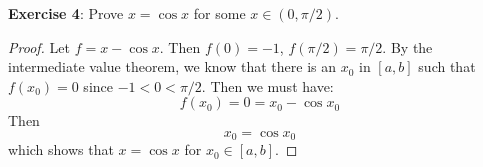 \documentclass{article}
\begin{document}
\textbf{Exercise 4}: Prove $x = \cos{x}$ for some $x \in (0, \pi/2)$.
    \begin{proof}
        Let $f = x - \cos{x}$. Then $f(0) = - 1$, $f(\pi/2) = \pi/2$. By the intermediate value theorem, we know that there is an $x_{0}$ in $[a, b]$ such that $f(x_{0}) = 0$ since $-1 < 0 < \pi/2$. Then we must have:
            \begin{equation*}
                f(x_{0}) = 0 = x_{0} - \cos{x_{0}}
            \end{equation*}
        Then
            \begin{equation*}
                x_{0} = \cos{x_{0}}
            \end{equation*}
        which shows that $x = \cos{x}$ for $x_{0} \in [a, b]$.
    \end{proof}
\end{document}
